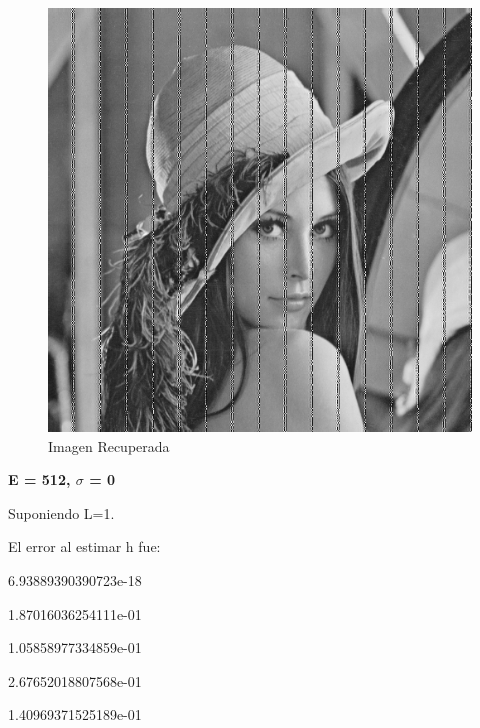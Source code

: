 \documentclass{article}
\begin{document}
\begin{multicols}{2}
\begin{figure}[H]
\centering
\includegraphics[scale=0.2]{../img/corrected_part5c.png}
\caption{Imagen Recuperada}

\end{figure}




\textbf{\large E = 512,  $\sigma$ = 0 }\\




\par \large{Suponiendo L=1.}
\par El error al estimar h fue:\\ 
\par   6.93889390390723e-18
\par   1.87016036254111e-01
\par   1.05858977334859e-01
\par   2.67652018807568e-01
\par   1.40969371525189e-01\\



\end{multicols}
\end{document}

